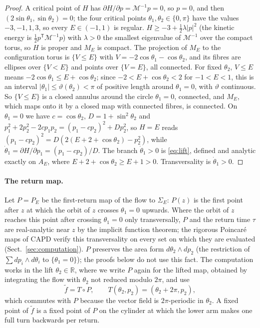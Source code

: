 \documentclass[11pt]{article}
\theoremstyle{definition}
\newcommand{\R}{\mathbb{R}}
\newcommand{\tf}{\tilde f}
\begin{document}
\begin{proof}
A critical point of $H$ has $\partial H/\partial p = \mathcal M^{-1}p = 0$, so $p = 0$, and then $(2\sin\theta_1, \sin\theta_2) = 0$; the four critical points $\theta_1, \theta_2 \in \{0, \pi\}$ have the values $-3, -1, 1, 3$, so every $E \in (-1, 1)$ is regular. $H \ge -3 + \tfrac12\lambda|p|^2$ (the kinetic energy is $\tfrac12 p^{\mathsf T}\mathcal M^{-1}p$) with $\lambda > 0$ the smallest eigenvalue of $\mathcal M^{-1}$ over the compact torus, so $H$ is proper and $M_E$ is compact. The projection of $M_E$ to the configuration torus is $\{V \le E\}$ with $V = -2\cos\theta_1 - \cos\theta_2$, and its fibres are ellipses over $\{V < E\}$ and points over $\{V = E\}$, all connected. For fixed $\theta_2$, $V \le E$ means $-2\cos\theta_1 \le E + \cos\theta_2$; since $-2 < E + \cos\theta_2 < 2$ for $-1 < E < 1$, this is an interval $|\theta_1| \le \vartheta(\theta_2) < \pi$ of positive length around $\theta_1 = 0$, with $\vartheta$ continuous. So $\{V \le E\}$ is a closed annulus around the circle $\theta_1 = 0$, connected, and $M_E$, which maps onto it by a closed map with connected fibres, is connected. On $\theta_1 = 0$ we have $c = \cos\theta_2$, $D = 1 + \sin^2\theta_2$ and $p_1^2 + 2p_2^2 - 2cp_1p_2 = (p_1 - cp_2)^2 + Dp_2^2$, so $H = E$ reads $(p_1 - cp_2)^2 = D(2(E + 2 + \cos\theta_2) - p_2^2)$, while $\dot\theta_1 = \partial H/\partial p_1 = (p_1 - cp_2)/D$. The branch $\dot\theta_1 > 0$ is \eqref{eq:lift}, defined and analytic exactly on $A_E$, where $E + 2 + \cos\theta_2 \ge E + 1 > 0$. Transversality is $\dot\theta_1 > 0$.
\end{proof}

\paragraph{The return map.} Let $P = P_E$ be the first-return map of the flow to $\Sigma_E$: $P(z)$ is the first point after $z$ at which the orbit of $z$ crosses $\theta_1 = 0$ upwards. Where the orbit of $z$ reaches this point after crossing $\theta_1 = 0$ only transversally, $P$ and the return time $\tau$ are real-analytic near $z$ by the implicit function theorem; the rigorous Poincar\'e maps of CAPD verify this transversality on every set on which they are evaluated (Sect.~\ref{sec:computation}). $P$ preserves the area form $d\theta_2 \wedge dp_2$ (the restriction of $\sum dp_i \wedge d\theta_i$ to $\{\theta_1 = 0\}$); the proofs below do not use this fact. The computation works in the lift $\theta_2 \in \R$, where we write $P$ again for the lifted map, obtained by integrating the flow with $\theta_2$ not reduced modulo $2\pi$, and use
\[
  \tf = T \circ P,\qquad T(\theta_2, p_2) = (\theta_2 + 2\pi, p_2),
\]
which commutes with $P$ because the vector field is $2\pi$-periodic in $\theta_2$. A fixed point of $\tf$ is a fixed point of $P$ on the cylinder at which the lower arm makes one full turn backwards per return.
\end{document}
